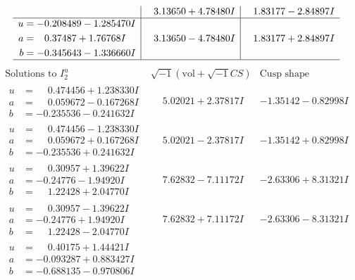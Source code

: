 \documentclass[1p]{elsarticle_modified}
\theoremstyle{definition}
\newcommand{\I}{\sqrt{-1}}
\begin{document}
$$\begin{array}{c|c|c}
 & \phantom{-}3.13650 + 4.78480 I & \phantom{-}1.83177 - 2.84897 I \\ \hline\begin{aligned}
u &= -0.208489 - 1.285470 I \\
a &= \phantom{-}0.37487 + 1.76768 I \\
b &= -0.345643 - 1.336660 I\end{aligned}
 & \phantom{-}3.13650 - 4.78480 I & \phantom{-}1.83177 + 2.84897 I\\
 \hline 
 \end{array}$$\newpage$$\begin{array}{c|c|c}  
\text{Solutions to }I^u_{2}& \I (\text{vol} + \sqrt{-1}CS) & \text{Cusp shape}\\
 \hline 
\begin{aligned}
u &= \phantom{-}0.474456 + 1.238330 I \\
a &= \phantom{-}0.059672 - 0.167268 I \\
b &= -0.235536 - 0.241632 I\end{aligned}
 & \phantom{-}5.02021 + 2.37817 I & -1.35142 - 0.82998 I \\ \hline\begin{aligned}
u &= \phantom{-}0.474456 - 1.238330 I \\
a &= \phantom{-}0.059672 + 0.167268 I \\
b &= -0.235536 + 0.241632 I\end{aligned}
 & \phantom{-}5.02021 - 2.37817 I & -1.35142 + 0.82998 I \\ \hline\begin{aligned}
u &= \phantom{-}0.30957 + 1.39622 I \\
a &= -0.24776 - 1.94920 I \\
b &= \phantom{-}1.22428 + 2.04770 I\end{aligned}
 & \phantom{-}7.62832 - 7.11172 I & -2.63306 + 8.31321 I \\ \hline\begin{aligned}
u &= \phantom{-}0.30957 - 1.39622 I \\
a &= -0.24776 + 1.94920 I \\
b &= \phantom{-}1.22428 - 2.04770 I\end{aligned}
 & \phantom{-}7.62832 + 7.11172 I & -2.63306 - 8.31321 I \\ \hline\begin{aligned}
u &= \phantom{-}0.40175 + 1.44421 I \\
a &= -0.093287 + 0.883427 I \\
b &= -0.688135 - 0.970806 I\end{aligned}

\end{array}$$
\end{document}
